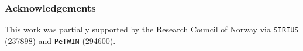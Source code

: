 \documentclass[runningheads]{llncs}
\begin{document}
\subsubsection*{Acknowledgements}
This work was partially supported by the Research Council of Norway via \texttt{SIRIUS} (237898) and \texttt{PeTWIN} (294600).
%

% 



\end{document}
